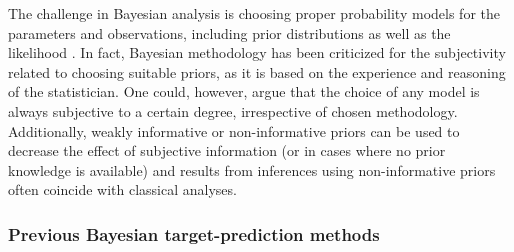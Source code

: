 The challenge in Bayesian analysis is choosing proper probability models for
the parameters and observations, including prior distributions as well as the
likelihood \citep{Gelman2013}. In fact, Bayesian methodology has been
criticized for the subjectivity related to choosing suitable priors, as it is
based on the experience and reasoning of the statistician. One could, however,
argue that the choice of any model is always subjective to a certain degree,
irrespective of chosen methodology. Additionally, weakly informative or non-informative
priors can be used to decrease the effect of subjective information (or
in cases where no prior knowledge is available) and results from
inferences using non-informative priors often coincide with classical
analyses.





\subsubsection{Previous Bayesian target-prediction methods}

